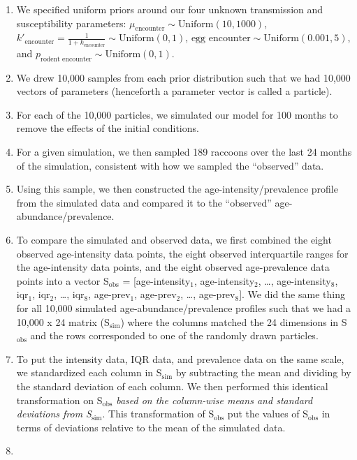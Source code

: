 \documentclass[a4paper]{article}
\begin{document}
\begin{enumerate}
\def\labelenumi{\arabic{enumi}.}
\item
  We specified uniform priors around our four unknown transmission and
  susceptibility parameters: $\mu_{\text{encounter}} \sim \text{Uniform}(10, 1000)$, $k'_{\text{encounter}} = \frac{1}{1 + k_{\text{encounter}}} \sim \text{Uniform}(0, 1)$, $\text{egg encounter} \sim \text{Uniform}(0.001, 5)$, and $p_{\text{rodent encounter}} \sim \text{Uniform}(0, 1)$.
\item
  We drew 10,000 samples from each prior distribution such that we had
  10,000 vectors of parameters (henceforth a parameter vector is called a particle).
\item
  For each of the 10,000 particles, we simulated our model for 100
  months to remove the effects of the initial conditions.
\item
  For a given simulation, we then sampled 189 raccoons over the last 24
  months of the simulation, consistent with how we sampled the ``observed'' data.
\item
  Using this sample, we then constructed the age-intensity/prevalence
  profile from the simulated data and compared it to the ``observed'' age-
  abundance/prevalence.
\item
  To compare the simulated and observed data, we first combined the
  eight observed age-intensity data points, the eight observed interquartile ranges for the age-intensity data points, and the eight observed
  age-prevalence data points into a vector S$_\text{obs}$ = [age-intensity$_1$,
  age-intensity$_2$, \ldots{}, age-intensity$_8$, iqr$_1$, iqr$_2$, \ldots{}, iqr$_8$, age-prev$_1$,
  age-prev$_2$, \ldots{}, age-prev$_8$]. We did the same thing for all
  10,000 simulated age-abundance/prevalence profiles such that we had a
  10,000 x 24 matrix (S$_\text{sim}$) where the columns matched the 24 dimensions
  in S$_\text{obs}$ and the rows corresponded to one of the randomly drawn
  particles.
\item
  To put the intensity data, IQR data, and prevalence data on the same
  scale, we standardized each column in S$_\text{sim}$ by subtracting the mean
  and dividing by the standard deviation of each column. We then
  performed this identical transformation on S$_\text{obs}$ \emph{based on the
  column-wise means and standard deviations from S$_\text{sim}$}. This
  transformation of S$_\text{obs}$ put the values of S$_\text{obs}$ in terms of
  deviations relative to the mean of the simulated data.
\item

\end{enumerate}
\end{document}
